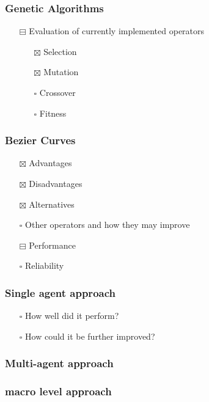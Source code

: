 \documentclass[11pt]{article}
\begin{document}
\subsubsection{{\bfseries\sffamily [ ]} Genetic Algorithms}
\label{sec:orgacf9dfb}
\begin{itemize}
\item[{$\boxminus$}] Evaluation of currently implemented operators
\begin{itemize}
\item[{$\boxtimes$}] Selection
\item[{$\boxtimes$}] Mutation
\item[{$\square$}] Crossover
\item[{$\square$}] Fitness
\end{itemize}
\end{itemize}
\subsubsection{{\bfseries\sffamily [ ]} Bezier Curves}
\label{sec:org0dacfc3}
\begin{itemize}
\item[{$\boxtimes$}] Advantages
\item[{$\boxtimes$}] Disadvantages
\item[{$\boxtimes$}] Alternatives
\item[{$\square$}] Other operators and how they may improve
\item[{$\boxminus$}] Performance
\item[{$\square$}] Reliability
\end{itemize}
\subsubsection{{\bfseries\sffamily [ ]} Single agent approach}
\label{sec:org689ec54}
\begin{itemize}
\item[{$\square$}] How well did it perform?
\item[{$\square$}] How could it be further improved?
\end{itemize}
\subsubsection{{\bfseries\sffamily [ ]} Multi-agent approach}
\label{sec:orgc692ea7}
\subsubsection{{\bfseries\sffamily [ ]} macro level approach}
\label{sec:orgab63143}
\end{document}
